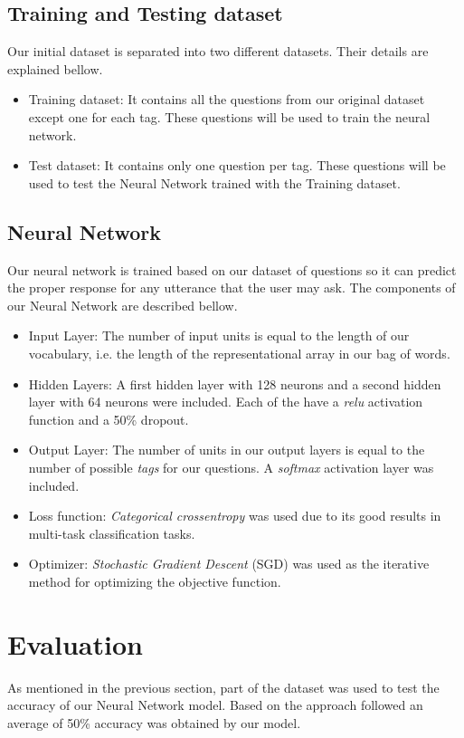 \documentclass[]{article}
\begin{document}
\subsection{Training and Testing dataset}
Our initial dataset is separated into two different datasets. Their details are explained bellow.

\begin{itemize}
  \item{Training dataset:} It contains all the questions from our original dataset except one for each tag. These questions will be used to train the neural network.
  \item{Test dataset:} It contains only one question per tag. These questions will be used to test the Neural Network trained with the Training dataset.
\end{itemize}

\subsection{Neural Network}
Our neural network is trained based on our dataset of questions so it can predict the proper response for any utterance that the user may ask. The components of our Neural Network are described bellow.

\begin{itemize}
  \item{Input Layer:} The number of input units is equal to the length of our vocabulary, i.e. the length of the representational array in our bag of words.
  \item{Hidden Layers:} A first hidden layer with 128 neurons and a second hidden layer with 64 neurons were included. Each of the have a \emph{relu} activation function and a 50\% dropout.
  \item{Output Layer:} The number of units in our output layers is equal to the number of possible \emph{tags} for our questions. A \emph{softmax} activation layer was included.
  \item{Loss function:} \emph{Categorical crossentropy} was used due to its good results in multi-task classification tasks.
  \item{Optimizer:} \emph{Stochastic Gradient Descent} (SGD) was used as the iterative method for optimizing the objective function.
\end{itemize}

\section{Evaluation}
As mentioned in the previous section, part of the dataset was used to test the accuracy of our Neural Network model. Based on the approach followed an average of 50\% accuracy was obtained by our model.
\end{document}
